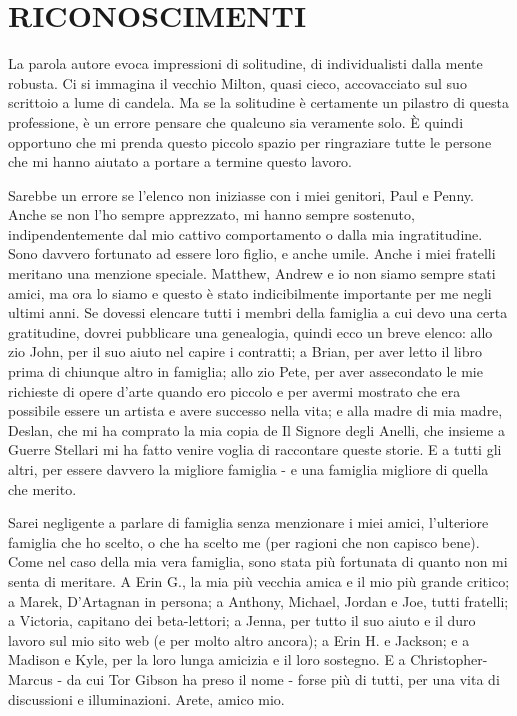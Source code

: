 { \chapter*{RICONOSCIMENTI}
	
La parola autore evoca impressioni di solitudine, di individualisti dalla mente robusta. Ci si immagina il vecchio Milton, quasi cieco, accovacciato sul suo scrittoio a lume di candela. Ma se la solitudine è certamente un pilastro di questa professione, è un errore pensare che qualcuno sia veramente solo. È quindi opportuno che mi prenda questo piccolo spazio per ringraziare tutte le persone che mi hanno aiutato a portare a termine questo lavoro.

Sarebbe un errore se l'elenco non iniziasse con i miei genitori, Paul e Penny. Anche se non l'ho sempre apprezzato, mi hanno sempre sostenuto, indipendentemente dal mio cattivo comportamento o dalla mia ingratitudine. Sono davvero fortunato ad essere loro figlio, e anche umile. Anche i miei fratelli meritano una menzione speciale. Matthew, Andrew e io non siamo sempre stati amici, ma ora lo siamo e questo è stato indicibilmente importante per me negli ultimi anni. Se dovessi elencare tutti i membri della famiglia a cui devo una certa gratitudine, dovrei pubblicare una genealogia, quindi ecco un breve elenco: allo zio John, per il suo aiuto nel capire i contratti; a Brian, per aver letto il libro prima di chiunque altro in famiglia; allo zio Pete, per aver assecondato le mie richieste di opere d'arte quando ero piccolo e per avermi mostrato che era possibile essere un artista e avere successo nella vita; e alla madre di mia madre, Deslan, che mi ha comprato la mia copia de Il Signore degli Anelli, che insieme a Guerre Stellari mi ha fatto venire voglia di raccontare queste storie. E a tutti gli altri, per essere davvero la migliore famiglia - e una famiglia migliore di quella che merito.

Sarei negligente a parlare di famiglia senza menzionare i miei amici, l'ulteriore famiglia che ho scelto, o che ha scelto me (per ragioni che non capisco bene). Come nel caso della mia vera famiglia, sono stata più fortunata di quanto non mi senta di meritare. A Erin G., la mia più vecchia amica e il mio più grande critico; a Marek, D'Artagnan in persona; a Anthony, Michael, Jordan e Joe, tutti fratelli; a Victoria, capitano dei beta-lettori; a Jenna, per tutto il suo aiuto e il duro lavoro sul mio sito web (e per molto altro ancora); a Erin H. e Jackson; e a Madison e Kyle, per la loro lunga amicizia e il loro sostegno. E a Christopher-Marcus - da cui Tor Gibson ha preso il nome - forse più di tutti, per una vita di discussioni e illuminazioni. Arete, amico mio.

}
